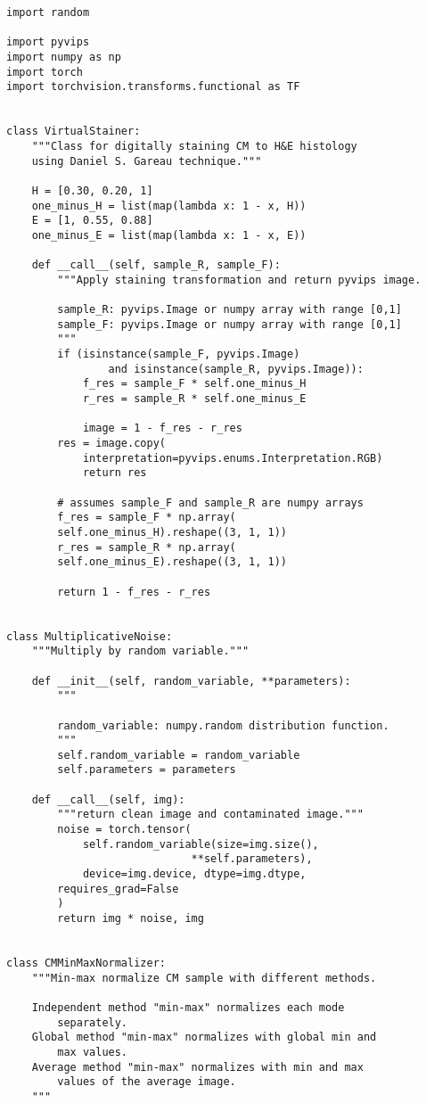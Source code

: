 \documentclass[../main.tex]{subfiles}
\begin{document}
\begin{lstlisting}
import random

import pyvips
import numpy as np
import torch
import torchvision.transforms.functional as TF


class VirtualStainer:
    """Class for digitally staining CM to H&E histology
    using Daniel S. Gareau technique."""

    H = [0.30, 0.20, 1]
    one_minus_H = list(map(lambda x: 1 - x, H))
    E = [1, 0.55, 0.88]
    one_minus_E = list(map(lambda x: 1 - x, E))

    def __call__(self, sample_R, sample_F):
        """Apply staining transformation and return pyvips image.

        sample_R: pyvips.Image or numpy array with range [0,1]
        sample_F: pyvips.Image or numpy array with range [0,1]
        """
        if (isinstance(sample_F, pyvips.Image)
                and isinstance(sample_R, pyvips.Image)):
            f_res = sample_F * self.one_minus_H
            r_res = sample_R * self.one_minus_E

            image = 1 - f_res - r_res
	    res = image.copy(
	    	interpretation=pyvips.enums.Interpretation.RGB)
            return res

        # assumes sample_F and sample_R are numpy arrays
        f_res = sample_F * np.array(
		self.one_minus_H).reshape((3, 1, 1))
        r_res = sample_R * np.array(
		self.one_minus_E).reshape((3, 1, 1))

        return 1 - f_res - r_res


class MultiplicativeNoise:
    """Multiply by random variable."""

    def __init__(self, random_variable, **parameters):
        """

        random_variable: numpy.random distribution function.
        """
        self.random_variable = random_variable
        self.parameters = parameters

    def __call__(self, img):
        """return clean image and contaminated image."""
        noise = torch.tensor(
            self.random_variable(size=img.size(),
	                         **self.parameters),
            device=img.device, dtype=img.dtype,
	    requires_grad=False
        )
        return img * noise, img


class CMMinMaxNormalizer:
    """Min-max normalize CM sample with different methods.

    Independent method "min-max" normalizes each mode
	    separately.
    Global method "min-max" normalizes with global min and
	    max values.
    Average method "min-max" normalizes with min and max
	    values of the average image.
    """


\end{lstlisting}
\end{document}
